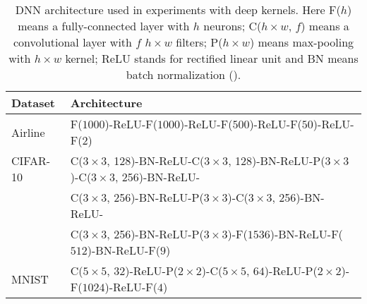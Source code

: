   \begin{table}[!t]
    \caption{DNN architecture used in experiments with deep kernels. Here F($h$) means a fully-connected layer with $h$ neurons; C($h{\times}w$, $f$) means a
    convolutional layer with $f$ $h{\times}w$ filters; P($h{\times}w$) means max-pooling with $h{\times}w$ kernel; ReLU stands for rectified linear unit
    and BN means batch normalization (\citet{ioffe2015}).}
    \label{deep_architecture}
    \centering
    \begin{tabular}{ll}
      \toprule
      Dataset & Architecture \\
      \midrule

      Airline & F($1000$)-ReLU-F($1000$)-ReLU-F($500$)-ReLU-F($50$)-ReLU-F($2$)\\

      CIFAR-10 & C($3{\times}3$, 128)-BN-ReLU-C($3{\times}3$, 128)-BN-ReLU-P($3{\times}3$)-C($3{\times}3$, 256)-BN-ReLU-\\
       & C($3{\times}3$, 256)-BN-ReLU-P($3{\times}3$)-C($3{\times}3$, 256)-BN-ReLU-\\
       & C($3{\times}3$, 256)-BN-ReLU-P($3{\times}3$)-F($1536$)-BN-ReLU-F($512$)-BN-ReLU-F($9$)\\

      MNIST & C($5{\times}5$, $32$)-ReLU-P($2{\times}2$)-C($5{\times}5$, $64$)-ReLU-P($2{\times}2$)-F($1024$)-ReLU-F($4$)\\
      \bottomrule
    \end{tabular}
  \end{table}
  

